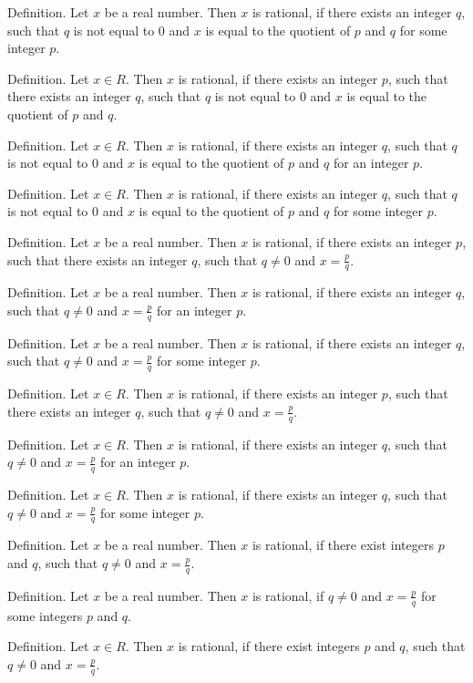 \documentclass{article}
\begin{document}
Definition. Let $x$ be a real number. Then $x$ is rational, if there exists an integer $q$, such that $q$ is not equal to $0$ and $x$ is equal to the quotient of $p$ and $q$ for some integer $p$.

Definition. Let $x \in R$. Then $x$ is rational, if there exists an integer $p$, such that there exists an integer $q$, such that $q$ is not equal to $0$ and $x$ is equal to the quotient of $p$ and $q$.

Definition. Let $x \in R$. Then $x$ is rational, if there exists an integer $q$, such that $q$ is not equal to $0$ and $x$ is equal to the quotient of $p$ and $q$ for an integer $p$.

Definition. Let $x \in R$. Then $x$ is rational, if there exists an integer $q$, such that $q$ is not equal to $0$ and $x$ is equal to the quotient of $p$ and $q$ for some integer $p$.

Definition. Let $x$ be a real number. Then $x$ is rational, if there exists an integer $p$, such that there exists an integer $q$, such that $q \neq 0$ and $x = \frac{ p}{q}$.

Definition. Let $x$ be a real number. Then $x$ is rational, if there exists an integer $q$, such that $q \neq 0$ and $x = \frac{ p}{q}$ for an integer $p$.

Definition. Let $x$ be a real number. Then $x$ is rational, if there exists an integer $q$, such that $q \neq 0$ and $x = \frac{ p}{q}$ for some integer $p$.

Definition. Let $x \in R$. Then $x$ is rational, if there exists an integer $p$, such that there exists an integer $q$, such that $q \neq 0$ and $x = \frac{ p}{q}$.

Definition. Let $x \in R$. Then $x$ is rational, if there exists an integer $q$, such that $q \neq 0$ and $x = \frac{ p}{q}$ for an integer $p$.

Definition. Let $x \in R$. Then $x$ is rational, if there exists an integer $q$, such that $q \neq 0$ and $x = \frac{ p}{q}$ for some integer $p$.

Definition. Let $x$ be a real number. Then $x$ is rational, if there exist integers $p$ and $q$, such that $q \neq 0$ and $x = \frac{ p}{q}$.

Definition. Let $x$ be a real number. Then $x$ is rational, if $q \neq 0$ and $x = \frac{ p}{q}$ for some integers $p$ and $q$.

Definition. Let $x \in R$. Then $x$ is rational, if there exist integers $p$ and $q$, such that $q \neq 0$ and $x = \frac{ p}{q}$.
\end{document}
